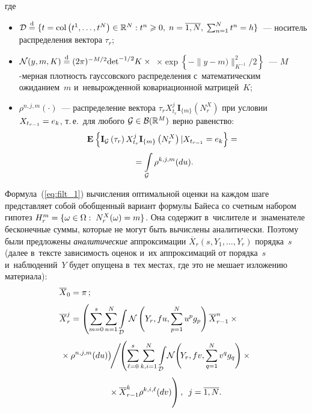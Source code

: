 \begin{multicols}{2}
 
 \noindent
 где 
 \begin{itemize}
 \item
 $\mathcal{D} \eqd \{t=\col\left(t^1,\ldots,t^N\right) \hm\in 
 \mathbb{R}^N: t^n \hm\geqslant 0, \; n\hm=\overline{1,N}, \;\sum\nolimits_{n=1}^N t^n \hm= h\}$~--- 
 носитель распределения вектора $\tau_r$;
 \item
 $ \mathcal{N}(y,m,K) \stackrel{\mathrm{d}}{=} (2\pi)^{-M/2} \mathrm{det}^{-1/2} K \times{}$\linebreak
 $\times
 \exp\left\{ -\|y-m)\|^2_{K^{-1}}/2\right\}$~--- 
 $M$-мер\-ная плот\-ность гауссовского распределения с~математическим ожиданием~$m$ 
 и~не\-вы\-рож\-ден\-ной ковариационной матрицей~$K$;
 \item
 $\rho^{n,j,m}(\cdot)$~--- распределение вектора 
 $\tau_{r}X_{t_{r}}^{j}\mathbf{I}_{\{m\}}(N_{r}^X)$ при условии $X_{t_{r-1}}\hm=e_k$, 
 т.\,е.\ 
 для любого $\mathcal{G}\hm \in \mathcal{B}(\mathbb{R}^M)$ верно равенство:
\begin{multline*}
\mathbf{E}_{  }\left\{ \mathop{\mathbf{I}_{\mathcal{G}}
\left(\tau_r\right)X_{t_r}^j\mathbf{I}_{\{m\}}\left(N_r^X\right)|X_{t_{r-1}}=e_k} \right\}
={}\\[3pt]
{}=
  \int\limits_{\mathcal{G}} \rho^{k,j,m}(du).
\end{multline*}
 \end{itemize}
Формула~(\ref{eq:filt_1}) вычисления оптимальной оценки на каждом шаге
представляет собой обобщенный вариант формулы Байеса со счетным набором 
гипотез $H_r^m \hm= \{\omega \in \Omega: \; N^X_r(\omega)\hm=m\}$.
Она содержит в~числителе и~знаменателе бесконечные суммы, 
которые не могут быть вычислены аналитически. Поэтому были предложены 
\textit{аналитические} аппроксимации $\overline{X}_r(s,Y_1,\ldots,Y_r)$ 
порядка~$s$ (далее в~тексте зависимость оценок и~их аппроксимаций от порядка~$s$ 
и~наблюдений~$Y$ будет опущена в~тех местах, где это не мешает изложению материала):
  \begin{align}
  \overline{X}_0 &=\pi\,; \notag\\[3pt]
\overline{X}_r^{j} &= \left(\sum\limits_{m=0}^{s}\sum\limits_{n=1}^N 
\int\limits_{\mathcal{D}} 
 \mathcal{N}\left(Y_{r},f u,\sum\limits_{p=1}^N u^p g_p\right) \overline{X}_{r-1}^n\times{}\right.\notag\\[3pt]
&\hspace*{-15pt}\left.{}\times    \rho^{n,j,m}(du)\right)\!\!\Bigg /\!\!
\left(
\sum\limits_{\ell=0}^{s}\sum\limits_{k,i=1}^N \int\limits_{\mathcal{D}} 
 \!\mathcal{N}\!\left(\!Y_{r},f v,\sum\limits_{q=1}^N v^q g_q\right)\times{}\right.\notag\\[3pt]
&\hspace*{15mm}\left. {}\times  \overline{X}_{r-1}^k
 \rho^{k,i,\ell}(dv)
  \vphantom{\int\limits_{\mathcal{D}}}
  \right), \enskip j=\overline{1,N}.
  \label{eq:filt_1_1}
 \end{align}
 

\end{multicols}
